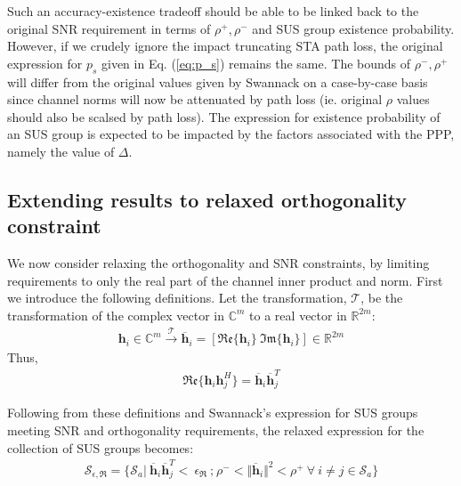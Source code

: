 Such an accuracy-existence tradeoff should be able to be linked back to the original SNR requirement in terms of $\rho^+,\rho^-$ and SUS group existence probability. However, if we crudely ignore the impact truncating STA path loss, the original expression for $p_s$ given in Eq. (\ref{eq:p_s}) remains the same. The bounds of $\rho^-,\rho^+$ will differ from the original values given by Swannack on a case-by-case basis since channel norms will now be attenuated by path loss (ie. original $\rho$ values should also be scalsed by path loss). The expression for existence probability of an SUS group is expected to be impacted by the factors associated with the PPP, namely the value of $\Delta$.
\newpage
\subsection{Extending results to relaxed orthogonality constraint}
We now consider relaxing the orthogonality and SNR constraints, by limiting  requirements to only the real part of the channel inner product and norm. First we introduce the following definitions. Let the  transformation, $\mathcal{T}$, be the transformation of the complex vector in $\mathbb{C}^m$ to a real vector in $\mathbb{R}^{2m}$:
\begin{equation}\label{eq:complex_real_xform}
    \begin{aligned}
        \textbf{h}_i \in \mathbb{C}^m \xrightarrow{\mathcal{T}} \overline{\textbf{h}}_i = [ \mathfrak{Re} \lbrace \textbf{h}_i \rbrace \ \mathfrak{Im}\lbrace \textbf{h}_i \rbrace ] \in \mathbb{R}^{2m}
    \end{aligned}
\end{equation}
Thus,
\begin{equation}\label{eq:orth_real_transp}
    \begin{aligned}
        \mathfrak{Re} \lbrace \textbf{h}_i\textbf{h}_j^H \rbrace = \overline{\textbf{h}}_i \overline{\textbf{h}}_j^T 
    \end{aligned}
\end{equation}

Following from these definitions and Swannack's expression for SUS groups meeting SNR and orthogonality requirements, the relaxed expression for the collection of SUS groups becomes:
\begin{equation}\label{eq:wl_S_e}
    \begin{aligned}
        \mathcal{S}_{\epsilon,\mathfrak{R}} = \lbrace \mathcal{S}_a \big|\  \overline{\textbf{h}}_i \overline{\textbf{h}}_j^T<\ \epsilon_{\mathfrak{R}} \ \text{;} \ \rho^-<\Vert \overline{\textbf{h}}_i \Vert^2 < \rho^+\ \forall \ i \neq j \in \mathcal{S}_a \rbrace
    \end{aligned}
\end{equation}

